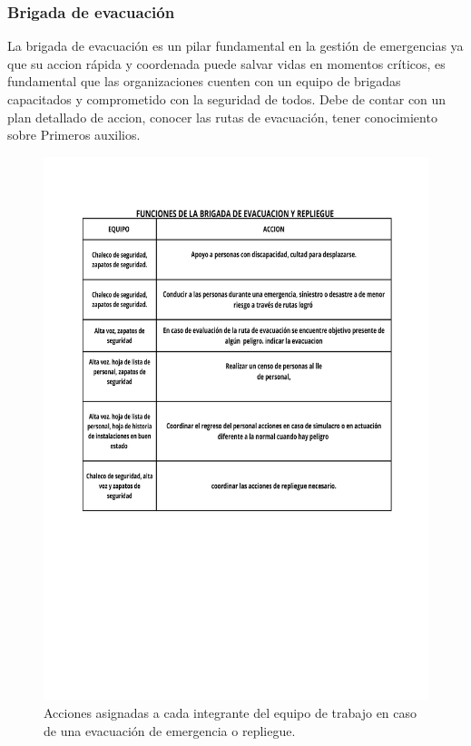     \subsubsection{Brigada de evacuación}
    La brigada de evacuación es un pilar fundamental en la gestión de emergencias ya que su accion rápida y coordenada puede salvar vidas en momentos críticos, es fundamental que las organizaciones cuenten con un equipo de brigadas capacitados y comprometido con la seguridad de todos.
    Debe de contar con un plan detallado de accion, conocer las rutas de evacuación, tener conocimiento sobre Primeros auxilios.
    \begin{figure}[H]
        \centering
        \includegraphics[trim = {15mm 35mm 20mm 45mm},clip,scale=0.5]{9/Img/brigadaEvacuacioon.pdf}
        \caption{Acciones asignadas a cada integrante del equipo de trabajo en caso de una evacuación de emergencia o repliegue.}
        \label{fig:brigada}
    \end{figure}
